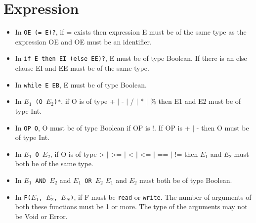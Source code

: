 \section{Expression}
\begin{itemize}

\item In \texttt{OE (= E)?}, if = exists then expression E must be of the same type as the expression OE and OE must be an identifier.

\item In \texttt{if E then EI (else EE)?}, E must be of type Boolean. If there is an else clause EI and EE must be of the same type.

\item In \texttt{while E EB}, E must be of type Boolean.

\item In \texttt{$E_1$ (O $E_2$)*}, if O is of type + $\mid$ - $\mid$ / $\mid$ * $\mid$ \% then E1 and E2 must be of type Int. 

\item In \texttt{OP O}, O must be of type Boolean if OP is !. If OP is + $\mid$ - then O must be of type Int. 

\item In \texttt{$E_1$ O $E_2$}, if O is of type > $\mid$ >= $\mid$ < $\mid$ <= $\mid$ == $\mid$ != then $E_1$ and $E_2$ must both be of the same type. 

\item In \texttt{$E_1$ AND $E_2$} and \texttt{$E_1$ OR $E_2$} $E_1$ and $E_2$ must both be of type Boolean. 

\item In \texttt{F($E_1$, $E_2$, $E_N$)}, if F must be \texttt{read} or \texttt{write}. The number of arguments of both these functions must be 1 or more. The type of the arguments may not be Void or Error.

\end{itemize}

